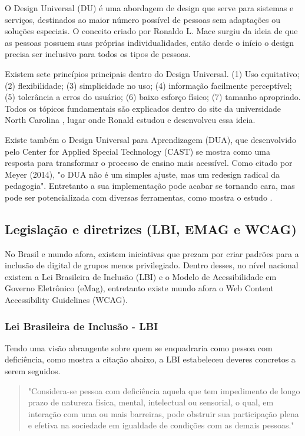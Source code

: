 O Design Universal (DU) é uma abordagem de design que serve para sistemas e serviços, destinados ao maior número possível de pessoas sem adaptações ou soluções especiais. O conceito criado por Ronaldo L. Mace surgiu da ideia de que as pessoas possuem suas próprias individualidades, então desde o início o design precisa ser inclusivo para todos os tipos de pessoas.

Existem sete princípios principais dentro do Design Universal. (1) Uso equitativo; (2) flexibilidade; (3) simplicidade no uso; (4) informação facilmente perceptível; (5) tolerância a erros do usuário; (6) baixo esforço físico; (7) tamanho apropriado. Todos os tópicos fundamentais são explicados dentro do site da universidade North Carolina \citep{cud_ncsu}, lugar onde Ronald estudou e desenvolveu essa ideia.

Existe também o Design Universal para Aprendizagem (DUA), que desenvolvido pelo Center for Applied Special Technology (CAST) se mostra como uma resposta para transformar o processo de ensino mais acessível. Como citado por Meyer (2014), "o DUA não é um simples ajuste, mas um redesign radical da pedagogia". Entretanto a sua implementação pode acabar se tornando cara, mas pode ser potencializada com diversas ferramentas, como mostra o estudo \citep{silva2025dua}.

\subsection*{Legislação e diretrizes (LBI, EMAG e WCAG)}

No Brasil e mundo afora, existem iniciativas que prezam por criar padrões para a inclusão de digital de grupos menos privilegiado. Dentro desses, no nível nacional existem a Lei Brasileira de Inclusão (LBI) e o Modelo de Acessibilidade em Governo Eletrônico (eMag), entretanto existe mundo afora o Web Content Accessibility Guidelines (WCAG).

\subsubsection{Lei Brasileira de Inclusão - LBI}

Tendo uma visão abrangente sobre quem se enquadraria como pessoa com deficiência, como mostra a citação abaixo, a LBI estabeleceu deveres concretos a serem seguidos.

\begin{quote}
"Considera-se pessoa com deficiência aquela que tem impedimento de longo prazo de natureza física, mental, intelectual ou sensorial, o qual, em interação com uma ou mais barreiras, pode obstruir sua participação plena e efetiva na sociedade em igualdade de condições com as demais pessoas."
\end{quote}


